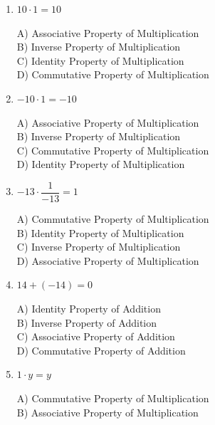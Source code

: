 \documentclass[11pt]{article}
\begin{document}
\begin{enumerate}
  \item $10 \cdot 1 = 10$
\\[2pt]
\begin{minipage}{\linewidth}
A) Associative Property of Multiplication \\
B) Inverse Property of Multiplication \\
C) Identity Property of Multiplication \\
D) Commutative Property of Multiplication
\end{minipage}
  \vspace{0.3cm}
  \item $-10 \cdot 1 = -10$
\\[2pt]
\begin{minipage}{\linewidth}
A) Associative Property of Multiplication \\
B) Inverse Property of Multiplication \\
C) Commutative Property of Multiplication \\
D) Identity Property of Multiplication
\end{minipage}
  \vspace{0.3cm}
  \item $-13 \cdot \dfrac{1}{-13} = 1$
\\[2pt]
\begin{minipage}{\linewidth}
A) Commutative Property of Multiplication \\
B) Identity Property of Multiplication \\
C) Inverse Property of Multiplication \\
D) Associative Property of Multiplication
\end{minipage}
  \vspace{0.3cm}
  \item $14 + (-14) = 0$
\\[2pt]
\begin{minipage}{\linewidth}
A) Identity Property of Addition \\
B) Inverse Property of Addition \\
C) Associative Property of Addition \\
D) Commutative Property of Addition
\end{minipage}
  \vspace{0.3cm}
  \item $1 \cdot y = y$
\\[2pt]
\begin{minipage}{\linewidth}
A) Commutative Property of Multiplication \\
B) Associative Property of Multiplication \\

\end{minipage}
\end{enumerate}
\end{document}
